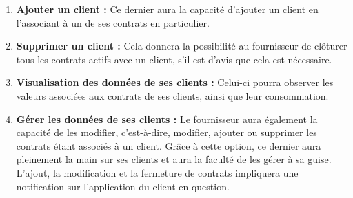 \begin{enumerate}[-]

\item \textbf{Ajouter un client : }
\newline
Ce dernier aura la capacité d’ajouter un client en l’associant à un de ses contrats en particulier.

\item \textbf{Supprimer un client :}
\newline
Cela donnera la possibilité au fournisseur de clôturer tous les contrats actifs avec un client, s’il est d’avis que cela est nécessaire.

\item \textbf{Visualisation des données de ses clients :}
\newline
Celui-ci pourra observer les valeurs associées aux contrats de ses clients, ainsi que leur consommation.

\item \textbf{Gérer les données de ses clients : }
\newline
Le fournisseur aura également la capacité de les modifier, c’est-à-dire, modifier, ajouter ou supprimer les contrats étant associés à un client.
\newline
Grâce à cette option, ce dernier aura pleinement la main sur ses clients et aura la faculté de les gérer à sa guise.
\newline
L’ajout, la modification et la fermeture de contrats impliquera une notification sur l’application du client en question.

\end{enumerate}